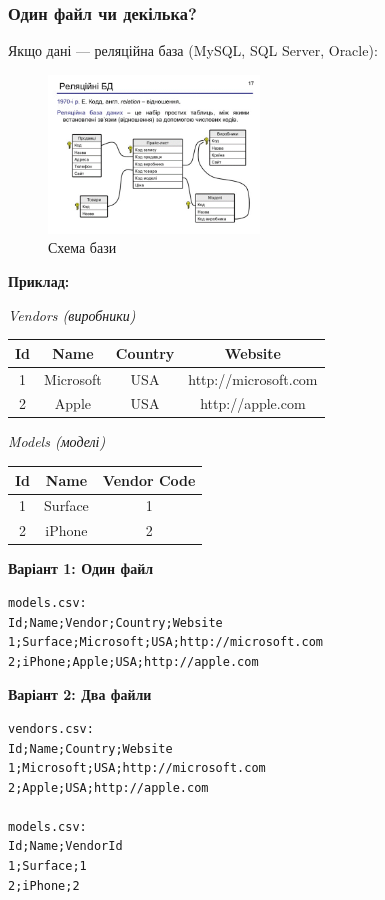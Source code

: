 \subsubsection{Один файл чи декілька?}

Якщо дані — реляційна база (MySQL, SQL Server, Oracle):

\begin{figure}[h]
    \centering
    \includegraphics[width=0.5\textwidth]{images/009.gif}
    \caption{Схема бази}
\end{figure}

\textbf{Приклад:}

\textit{Vendors (виробники)}

\begin{tabular}{|c|c|c|c|}
\hline
Id & Name      & Country & Website              \\
\hline
1  & Microsoft & USA     & http://microsoft.com \\
2  & Apple     & USA     & http://apple.com     \\
\hline
\end{tabular}

\textit{Models (моделі)}

\begin{tabular}{|c|c|c|}
\hline
Id & Name    & Vendor Code \\
\hline
1  & Surface & 1           \\
2  & iPhone  & 2           \\
\hline
\end{tabular}

\textbf{Варіант 1: Один файл}

\begin{verbatim}
models.csv:
Id;Name;Vendor;Country;Website
1;Surface;Microsoft;USA;http://microsoft.com
2;iPhone;Apple;USA;http://apple.com
\end{verbatim}

\textbf{Варіант 2: Два файли}

\begin{verbatim}
vendors.csv:
Id;Name;Country;Website
1;Microsoft;USA;http://microsoft.com
2;Apple;USA;http://apple.com

models.csv:
Id;Name;VendorId
1;Surface;1
2;iPhone;2
\end{verbatim}

